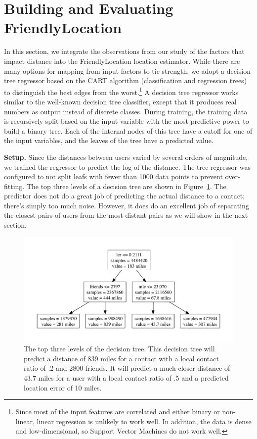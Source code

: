 \documentclass[letterpaper]{article}
\begin{document}
\section{Building and Evaluating FriendlyLocation}

In this section, we integrate the observations from our study of the factors that impact distance into the FriendlyLocation location estimator.
%
While there are many options for mapping from input factors to tie strength, we adopt a decision tree regressor based on the CART algorithm (classification and regression trees) to distinguish the best edges from the worst.\footnote{Since most of the input features are correlated and either binary or non-linear,
linear regression is unlikely to work well. In addition, the data is dense and low-dimensional, so Support Vector Machines
do not work well.} A decision tree regressor works similar to the well-known decision tree classifier, except that it produces real numbers as output instead of discrete classes. During training, the training data is recursively split based on the input
variable with the most predictive power to build a binary tree.  Each of the internal nodes of this tree have a cutoff for one of the input
variables, and the leaves of the tree have a predicted value.


\medskip
\noindent\textbf{Setup.} Since the distances between users varied by several orders of magnitude, we
trained the regressor to predict the log of the distance.
%
The tree regressor was configured to not split leafs with fewer than 1000 data
points to prevent over-fitting.
%
The top three levels of a decision tree are shown in Figure~\ref{fig:TreeTop}.
%
The predictor does not do a great job of predicting the actual distance to a
contact; there's simply too much noise.
%
However, it does do an excellent job of separating the closest pairs of users
from the most distant pairs as we will show in the next section.

\begin{figure}[tbh]
\centering
\includegraphics[width=\linewidth]{figures/tree_top.pdf}
\caption{
    The top three levels of the decision tree. This decision tree will predict a
    distance of 839 miles for a contact with a local contact ratio of .2 and
    2800 friends. It will predict a much-closer distance of 43.7 miles for a
    user with a local contact ratio of .5 and a predicted location error of 10
    miles.
}
\label{fig:TreeTop}
\end{figure}
\end{document}
